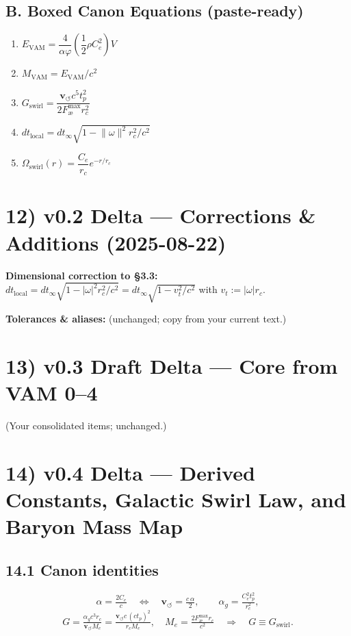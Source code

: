 \documentclass[11pt,a4paper]{article}
\begin{document}
    \subsection*{B. Boxed Canon Equations (paste-ready)}
    \begin{enumerate}
        \item $E_{\text{VAM}}=\dfrac{4}{\alpha\varphi}\left(\dfrac{1}{2}\rho C_e^2\right)V$
        \item $M_{\text{VAM}}=E_{\text{VAM}}/c^2$
        \item $G_{\text{swirl}}=\dfrac{\mathbf{v}_{\scriptscriptstyle\boldsymbol{\circlearrowleft}} c^5 t_p^2}{2F_{\text{\ae}}^{\max} r_c^2}$
        \item $dt_{\text{local}}=dt_{\infty}\sqrt{1-\lVert\omega\rVert^{2} r_c^{2}/c^2}$ %
        \item $\Omega_{\text{swirl}}(r)=\dfrac{C_e}{r_c}e^{-r/r_c}$
    \end{enumerate}

    \section*{12) v0.2 Delta — Corrections \& Additions (2025-08-22)}
    \textbf{Dimensional correction to §3.3:} $dt_{\text{local}} = dt_{\infty}\sqrt{1 - |\omega|^2 r_c^2 / c^2} = dt_{\infty}\sqrt{1 - v_t^2/c^2}$ with $v_t:=|\omega|r_c$.
    \medskip

    \textbf{Tolerances \& aliases:} (unchanged; copy from your current text.)

    \section*{13) v0.3 Draft Delta — Core from VAM 0–4}
    (Your consolidated items; unchanged.)

    \section*{14) v0.4 Delta — Derived Constants, Galactic Swirl Law, and Baryon Mass Map}
    \subsection*{14.1 Canon identities}
    \[
        \boxed{\alpha = \tfrac{2 C_e}{c}}\quad\Leftrightarrow\quad \boxed{\mathbf{v}_{\scriptscriptstyle\boldsymbol{\circlearrowleft}} = \tfrac{c\,\alpha}{2}},\qquad
        \boxed{\alpha_g = \tfrac{C_e^{2} t_p^{2}}{r_c^{2}}},
    \]
    \[
        \boxed{G = \tfrac{\alpha_g c^{3} r_c}{\mathbf{v}_{\scriptscriptstyle\boldsymbol{\circlearrowleft}} M_e} = \tfrac{\mathbf{v}_{\scriptscriptstyle\boldsymbol{\circlearrowleft}} c\, (c t_p)^{2}}{r_c M_e}},
        \quad
        \boxed{M_e = \tfrac{2 F_{\text{\ae}}^{\max} r_c}{c^{2}}}
        \quad\Rightarrow\quad
        \boxed{G \equiv G_{\text{swirl}}}.
    \]
\end{document}

